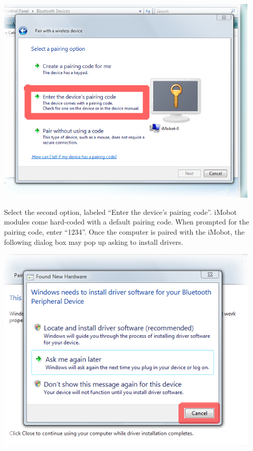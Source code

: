 \documentclass[11pt]{report}
\begin{document}
\begin{center}
\includegraphics[width=5in]{images/imobot_connect_3.png}
\end{center}

Select the second option, labeled ``Enter the device's pairing code''. iMobot
modules come hard-coded with a default pairing code. When prompted for the
pairing code, enter ``1234''. Once the computer is paired with the iMobot,
the following dialog box may pop up asking to install drivers.

\begin{center}
\includegraphics[width=5in]{images/imobot_connect_4.png}
\end{center}
\end{document}
